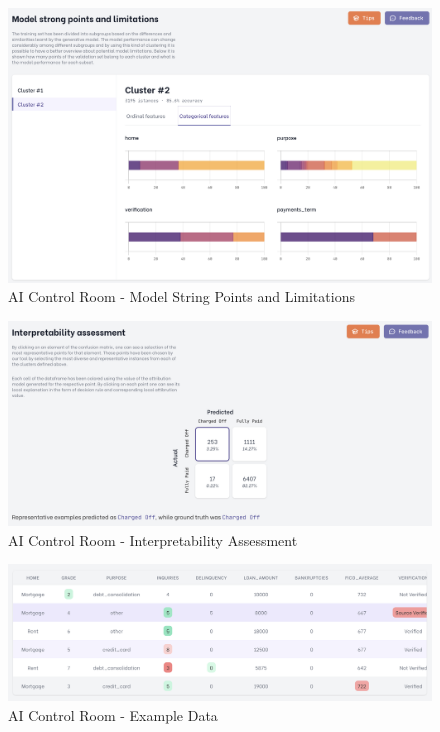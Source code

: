 \documentclass[11pt,a4paper,english]{scrreprt}
\begin{document}
\begin{figure}[htbp]
    \centering
    \includegraphics[width=\textwidth]{img/screenshots/model_assessment_analysis.png}
    \caption{AI Control Room - Model String Points and Limitations}
    \label{fig:model_assessment_analysis}
\end{figure}
\begin{figure}[htbp]
    \centering
    \includegraphics[width=\textwidth]{img/screenshots/model_assessment_interpret.png}
    \caption{AI Control Room - Interpretability Assessment}
    \label{fig:model_assessment_interpret}
\end{figure}
\begin{figure}[htbp]
    \centering
    \includegraphics[width=\textwidth]{img/screenshots/model_assessment_examples.png}
    \caption{AI Control Room - Example Data}
    \label{fig:model_assessment_examples}
\end{figure}
\end{document}
